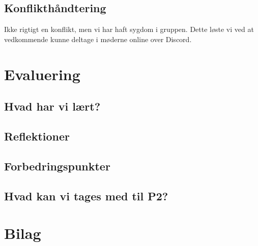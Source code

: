 \documentclass[12pt,a4paper]{article}
\begin{document}
\subsection{Konflikthåndtering}
Ikke rigtigt en konflikt, men vi har haft sygdom i gruppen. Dette løste vi ved at vedkommende kunne deltage i møderne online over Discord.  


\section{Evaluering}
\subsection{Hvad har vi lært?}
\subsection{Reflektioner}
\subsection{Forbedringspunkter}
\subsection{Hvad kan vi tages med til P2?}

\clearpage
\section{Bilag}
\end{document}
